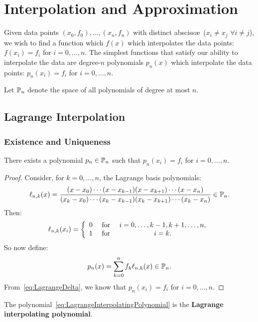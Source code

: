 \chapter{Interpolation and Approximation}\label{chapter:InterpolationApproximation}

Given data points $(x_0,f_0),\ldots,(x_n,f_n)$ with distinct absciss\ae~($x_i\ne x_j$ $\forall i\ne j$), we wish to find a function which $f(x)$ which interpolates the data points: $f(x_i) = f_i$ for $i=0,\ldots,n$. The simplest functions that satisfy our ability to interpolate the data are degree-$n$ polynomials $p_n(x)$ which interpolate the data points: $p_n(x_i) = f_i$ for $i=0,\ldots,n$.

Let $\P_n$ denote the space of all polynomials of degree at most $n$.

\section{Lagrange Interpolation}

\subsection{Existence and Uniqueness}

\begin{theorem}
There exists a polynomial $p_n\in\P_n$ such that $p_n(x_i) = f_i$ for $i=0,\ldots,n$.
\end{theorem}
\begin{proof}
Consider, for $k=0,\ldots,n$, the Lagrange basis polynomials:
\begin{equation}\label{eq:LagrangeBasisPolynomial}
\ell_{n,k}(x) = \dfrac{(x-x_0)\cdots(x-x_{k-1})(x-x_{k+1})\cdots(x-x_n)}{(x_k-x_0)\cdots(x_k-x_{k-1})(x_k-x_{k+1})\cdots(x_k-x_n)}\in\P_n.
\end{equation}
Then:
\begin{equation}\label{eq:LagrangeDelta}
\ell_{n,k}(x_i) = \left\{\begin{array}{ccc} 0 & \for & i = 0,\ldots,k-1,k+1,\ldots,n,\\ 1 & \for & i=k.\end{array}\right.
\end{equation}
So now define:
\begin{equation}\label{eq:LagrangeInterpolatingPolynomial}
p_n(x) = \sum_{k=0}^n f_k \ell_{n,k}(x) \in \P_n.
\end{equation}
From~\eqref{eq:LagrangeDelta}, we know that $p_n(x_i) = f_i$ for $i=0,\ldots,n$.
\end{proof}
The polynomial~\eqref{eq:LagrangeInterpolatingPolynomial} is the {\bf Lagrange interpolating polynomial}.


